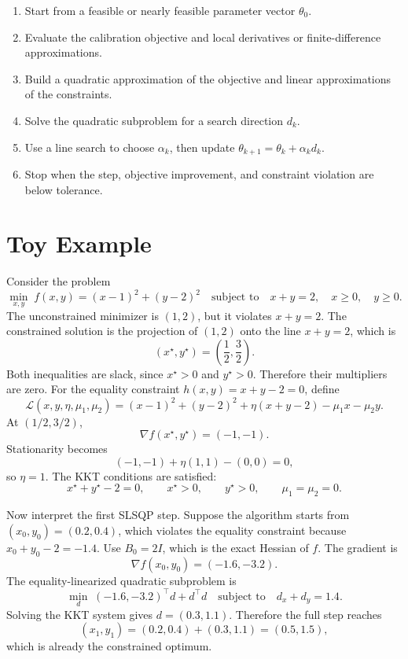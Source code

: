 \documentclass[a4paper,10pt,titlepage,oneside,openany]{book}
\theoremstyle{plain}
\theoremstyle{definition}
\theoremstyle{remark}
\newcommand{\Lag}{\mathcal{L}}
\begin{document}
\begin{tcolorbox}[title={Simplified SLSQP loop}, colback=white, boxrule=0.4pt]
\begin{enumerate}[leftmargin=8mm, itemsep=2pt]
    \item Start from a feasible or nearly feasible parameter vector \(\theta_0\).
    \item Evaluate the calibration objective and local derivatives or finite-difference approximations.
    \item Build a quadratic approximation of the objective and linear approximations of the constraints.
    \item Solve the quadratic subproblem for a search direction \(d_k\).
    \item Use a line search to choose \(\alpha_k\), then update \(\theta_{k+1}=\theta_k+\alpha_k d_k\).
    \item Stop when the step, objective improvement, and constraint violation are below tolerance.
\end{enumerate}
\end{tcolorbox}

\section{Toy Example}

Consider the problem
\begin{equation}
    \min_{x,y}\; f(x,y)=(x-1)^2+(y-2)^2
    \quad\text{subject to}\quad
    x+y=2,\quad x\geq0,\quad y\geq0.
    \label{eq:toy}
\end{equation}
The unconstrained minimizer is \((1,2)\), but it violates \(x+y=2\). The constrained solution is the projection of \((1,2)\) onto the line \(x+y=2\), which is
\begin{equation}
    (x^\star,y^\star)=\left(\frac{1}{2},\frac{3}{2}\right).
\end{equation}
Both inequalities are slack, since \(x^\star>0\) and \(y^\star>0\). Therefore their multipliers are zero. For the equality constraint \(h(x,y)=x+y-2=0\), define
\[
    \Lag(x,y,\eta,\mu_1,\mu_2)
    =
    (x-1)^2+(y-2)^2
    +\eta(x+y-2)-\mu_1x-\mu_2y.
\]
At \((1/2,3/2)\),
\[
    \nabla f(x^\star,y^\star)=(-1,-1).
\]
Stationarity becomes
\[
    (-1,-1)+\eta(1,1)-(0,0)=0,
\]
so \(\eta=1\). The KKT conditions are satisfied:
\[
    x^\star+y^\star-2=0,\qquad x^\star>0,\qquad y^\star>0,\qquad
    \mu_1=\mu_2=0.
\]

Now interpret the first SLSQP step. Suppose the algorithm starts from \((x_0,y_0)=(0.2,0.4)\), which violates the equality constraint because \(x_0+y_0-2=-1.4\). Use \(B_0=2I\), which is the exact Hessian of \(f\). The gradient is
\[
    \nabla f(x_0,y_0)=(-1.6,-3.2).
\]
The equality-linearized quadratic subproblem is
\[
    \min_d\; (-1.6,-3.2)^\top d+d^\top d
    \quad\text{subject to}\quad d_x+d_y=1.4.
\]
Solving the KKT system gives \(d=(0.3,1.1)\). Therefore the full step reaches
\[
    (x_1,y_1)=(0.2,0.4)+(0.3,1.1)=(0.5,1.5),
\]
which is already the constrained optimum.
\end{document}

